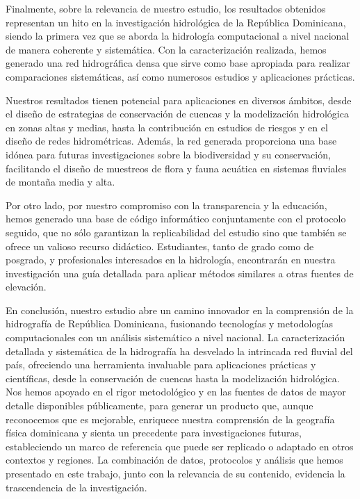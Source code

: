 \documentclass[spanish]{article}
\begin{document}
Finalmente, sobre la relevancia de nuestro estudio, los resultados
obtenidos representan un hito en la investigación hidrológica de la
República Dominicana, siendo la primera vez que se aborda la hidrología
computacional a nivel nacional de manera coherente y sistemática. Con la
caracterización realizada, hemos generado una red hidrográfica densa que
sirve como base apropiada para realizar comparaciones sistemáticas, así
como numerosos estudios y aplicaciones prácticas.

Nuestros resultados tienen potencial para aplicaciones en diversos
ámbitos, desde el diseño de estrategias de conservación de cuencas y la
modelización hidrológica en zonas altas y medias, hasta la contribución
en estudios de riesgos y en el diseño de redes hidrométricas. Además, la
red generada proporciona una base idónea para futuras investigaciones
sobre la biodiversidad y su conservación, facilitando el diseño de
muestreos de flora y fauna acuática en sistemas fluviales de montaña
media y alta.

Por otro lado, por nuestro compromiso con la transparencia y la
educación, hemos generado una base de código informático conjuntamente
con el protocolo seguido, que no sólo garantizan la replicabilidad del
estudio sino que también se ofrece un valioso recurso didáctico.
Estudiantes, tanto de grado como de posgrado, y profesionales
interesados en la hidrología, encontrarán en nuestra investigación una
guía detallada para aplicar métodos similares a otras fuentes de
elevación.

En conclusión, nuestro estudio abre un camino innovador en la
comprensión de la hidrografía de República Dominicana, fusionando
tecnologías y metodologías computacionales con un análisis sistemático a
nivel nacional. La caracterización detallada y sistemática de la
hidrografía ha desvelado la intrincada red fluvial del país, ofreciendo
una herramienta invaluable para aplicaciones prácticas y científicas,
desde la conservación de cuencas hasta la modelización hidrológica. Nos
hemos apoyado en el rigor metodológico y en las fuentes de datos de
mayor detalle disponibles públicamente, para generar un producto que,
aunque reconocemos que es mejorable, enriquece nuestra comprensión de la
geografía física dominicana y sienta un precedente para investigaciones
futuras, estableciendo un marco de referencia que puede ser replicado o
adaptado en otros contextos y regiones. La combinación de datos,
protocolos y análisis que hemos presentado en este trabajo, junto con la
relevancia de su contenido, evidencia la trascendencia de la
investigación.
\end{document}
